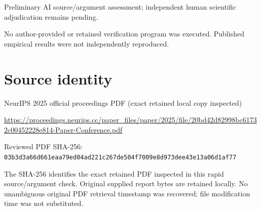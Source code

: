 \documentclass[11pt]{article}
\begin{document}
Preliminary AI source/argument assessment; independent human scientific adjudication remains pending.\par

No author-provided or retained verification program was executed. Published empirical results were not independently reproduced.\par

\section*{Source identity}

NeurIPS 2025 official proceedings PDF (exact retained local copy inspected)

\url{https://proceedings.neurips.cc/paper_files/paper/2025/file/20bd42d82998bc61732c00452228e814-Paper-Conference.pdf}

Reviewed PDF SHA-256: \nolinkurl{03b3d3a66d661eaa79ed04ad221c267de504f7009e8d973dee43e13a06d1af77}

The SHA-256 identifies the exact retained PDF inspected in this rapid source/argument check. Original supplied report bytes are retained locally. No unambiguous original PDF retrieval timestamp was recovered; file modification time was not substituted.
\end{document}
